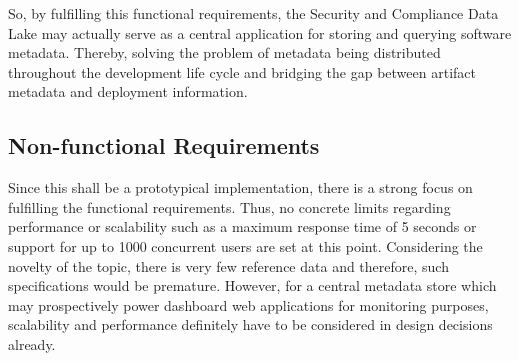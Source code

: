 So, by fulfilling this functional requirements, the Security and Compliance Data Lake may actually serve as a central application for storing and querying software metadata. Thereby, solving the problem of metadata being distributed throughout the development life cycle and bridging the gap between artifact metadata and deployment information.

\subsection{Non-functional Requirements} \label{sec:Non-functional Requirements}
Since this shall be a prototypical implementation, there is a strong focus on fulfilling the functional requirements. Thus, no concrete limits regarding performance or scalability such as a maximum response time of 5 seconds or support for up to 1000 concurrent users are set at this point. %
Considering the novelty of the topic, there is very few reference data and therefore, such specifications would be premature. However, for a central metadata store which may prospectively power dashboard web applications for monitoring purposes, scalability and performance definitely have to be considered in design decisions already.

